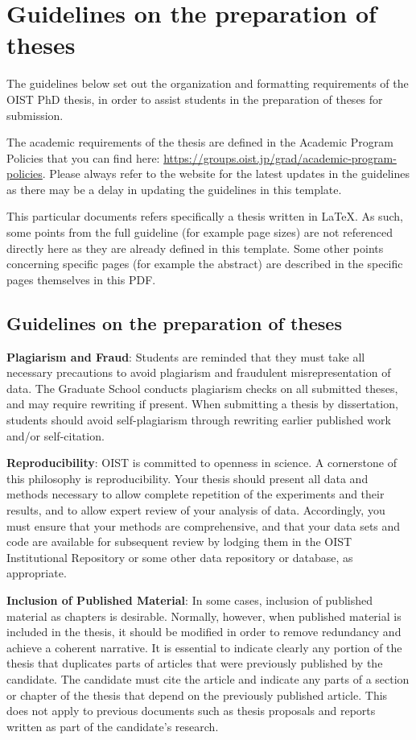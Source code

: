 
\chapter{Guidelines on the preparation of theses} \label{ch-1}

The guidelines below set out the organization and formatting requirements of the OIST PhD thesis, in order to assist students in the preparation of theses for submission.

The academic requirements of the thesis are defined in the Academic Program Policies that you can find here: \url{https://groups.oist.jp/grad/academic-program-policies}. Please always refer to the website for the latest updates in the guidelines as there may be a delay in updating the guidelines in this template.

This particular documents refers specifically a thesis written in \LaTeX. As such, some points from the full guideline (for example page sizes) are not referenced directly here as they are already defined in this template. Some other points concerning specific pages (for example the abstract) are described in the specific pages themselves in this PDF.

\section{Guidelines on the preparation of theses}

\textbf{Plagiarism and Fraud}:  Students are reminded that they must take all necessary precautions to avoid plagiarism and fraudulent misrepresentation of data.  The Graduate School conducts plagiarism checks on all submitted theses, and may require rewriting if present.  When submitting a thesis by dissertation, students should avoid self-plagiarism through rewriting earlier published work and/or self-citation.

\textbf{Reproducibility}: OIST is committed to openness in science.  A cornerstone of this philosophy is reproducibility.  Your thesis should present all data and methods necessary to allow complete repetition of the experiments and their results, and to allow expert review of your analysis of data.  Accordingly, you must ensure that your methods are comprehensive, and that your data sets and code are available for subsequent review by lodging them in the OIST Institutional Repository or some other data repository or database, as appropriate.

\textbf{Inclusion of Published Material}: In some cases, inclusion of published material as chapters is desirable.  Normally, however, when published material is included in the thesis, it should be modified in order to remove redundancy and achieve a coherent narrative.  It is essential to indicate clearly any portion of the thesis that duplicates parts of articles that were previously published by the candidate.  The candidate must cite the article and indicate any parts of a section or chapter of the thesis that depend on the previously published article.  This does not apply to previous documents such as thesis proposals and reports written as part of the candidate’s research.

